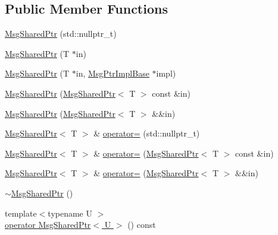 \subsection*{Public Member Functions}
\begin{DoxyCompactItemize}
\item 
\hyperlink{structvt_1_1messaging_1_1_msg_shared_ptr_a560ea1c81555ee5ea06efaa86445ba1b}{Msg\+Shared\+Ptr} (std\+::nullptr\+\_\+t)
\item 
\hyperlink{structvt_1_1messaging_1_1_msg_shared_ptr_a26e2fce2835b47a4035450b0f415db87}{Msg\+Shared\+Ptr} (T $\ast$in)
\item 
\hyperlink{structvt_1_1messaging_1_1_msg_shared_ptr_acb1c93e303f1abe4c241afe04b012b88}{Msg\+Shared\+Ptr} (T $\ast$in, \hyperlink{structvt_1_1messaging_1_1_msg_ptr_impl_base}{Msg\+Ptr\+Impl\+Base} $\ast$impl)
\item 
\hyperlink{structvt_1_1messaging_1_1_msg_shared_ptr_a9a10d5bd3b45b0c2e1805951b3a29664}{Msg\+Shared\+Ptr} (\hyperlink{structvt_1_1messaging_1_1_msg_shared_ptr}{Msg\+Shared\+Ptr}$<$ T $>$ const \&in)
\item 
\hyperlink{structvt_1_1messaging_1_1_msg_shared_ptr_af08de8fd20fe431e551273451123b334}{Msg\+Shared\+Ptr} (\hyperlink{structvt_1_1messaging_1_1_msg_shared_ptr}{Msg\+Shared\+Ptr}$<$ T $>$ \&\&in)
\item 
\hyperlink{structvt_1_1messaging_1_1_msg_shared_ptr}{Msg\+Shared\+Ptr}$<$ T $>$ \& \hyperlink{structvt_1_1messaging_1_1_msg_shared_ptr_ac6f496608ceb2f96b9457b0082f76e28}{operator=} (std\+::nullptr\+\_\+t)
\item 
\hyperlink{structvt_1_1messaging_1_1_msg_shared_ptr}{Msg\+Shared\+Ptr}$<$ T $>$ \& \hyperlink{structvt_1_1messaging_1_1_msg_shared_ptr_af2b0f17fdd4601d00b75410699fa5738}{operator=} (\hyperlink{structvt_1_1messaging_1_1_msg_shared_ptr}{Msg\+Shared\+Ptr}$<$ T $>$ const \&in)
\item 
\hyperlink{structvt_1_1messaging_1_1_msg_shared_ptr}{Msg\+Shared\+Ptr}$<$ T $>$ \& \hyperlink{structvt_1_1messaging_1_1_msg_shared_ptr_ad6712e7dac73e70a61690e83122fda7c}{operator=} (\hyperlink{structvt_1_1messaging_1_1_msg_shared_ptr}{Msg\+Shared\+Ptr}$<$ T $>$ \&\&in)
\item 
\hyperlink{structvt_1_1messaging_1_1_msg_shared_ptr_a41b62019acea0627ce3297d31257524c}{$\sim$\+Msg\+Shared\+Ptr} ()
\item 
{\footnotesize template$<$typename U $>$ }\\\hyperlink{structvt_1_1messaging_1_1_msg_shared_ptr_a984ff1a806b338a5fce6fc1861fd0198}{operator Msg\+Shared\+Ptr$<$ U $>$} () const

\end{DoxyCompactItemize}
